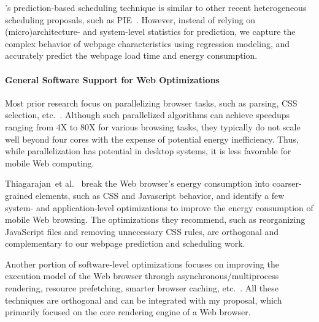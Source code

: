 \webrt's prediction-based scheduling technique is similar to other recent heterogeneous scheduling proposals, such as PIE~\cite{PIE}. However, instead of relying on (micro)architecture- and system-level statistics for prediction, we capture the complex behavior of webpage characteristics using regression modeling, and accurately predict the webpage load time and energy consumption.

\paragraph{General Software Support for Web Optimizations} Most prior research focus on parallelizing browser tasks, such as parsing, CSS selection, etc.~\cite{ParallelBrowser,FTL,UCI,Parabix}. Although such parallelized algorithms can achieve speedups ranging from 4X to 80X for various browsing tasks, they typically do not scale well beyond four cores with the expense of potential energy inefficiency. Thus, while parallelization has potential in desktop systems, it is less favorable for mobile Web computing.

Thiagarajan~et al.~\cite{www-battery} break the Web browser's energy consumption into coarser-grained elements, such as CSS and Javascript behavior, and identify a few system- and application-level optimizations to improve the energy consumption of mobile Web browsing.  The optimizations they recommend, such as reorganizing JavaScript files and removing unnecessary CSS rules, are orthogonal and complementary to our webpage prediction and scheduling work.

Another portion of software-level optimizations focuses on improving the execution model of the Web browser through asynchronous/multiprocess rendering, resource prefetching, smarter browser caching, etc.~\cite{pocketweb,Adrenaline,smart-caching,webkit2,firefox-spec_parsing}. All these techniques are orthogonal and can be integrated with my proposal, which primarily focused on the core rendering engine of a Web browser.

